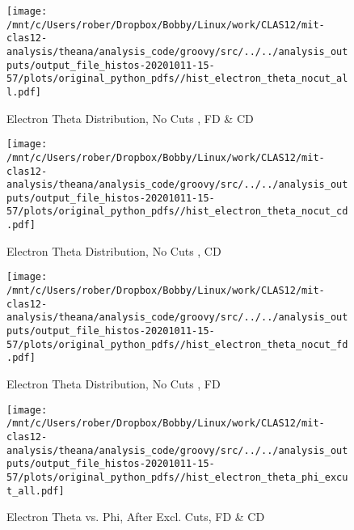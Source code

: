 \documentclass{article}
\begin{document}
\begin{landscape}
    \begin{figure}[h]
        \centering

        \texttt{[image: /mnt/c/Users/rober/Dropbox/Bobby/Linux/work/CLAS12/mit-clas12-analysis/theana/analysis\_code/groovy/src/../../analysis\_outputs/output\_file\_histos-20201011-15-57/plots/original\_python\_pdfs//hist\_electron\_theta\_nocut\_all.pdf]}
        \captionsetup{textformat=empty,labelformat=blank}
        \caption{Electron Theta Distribution, No Cuts , FD \& CD}
    \end{figure}
    \clearpage
    
    \begin{figure}[h]
        \centering

        \texttt{[image: /mnt/c/Users/rober/Dropbox/Bobby/Linux/work/CLAS12/mit-clas12-analysis/theana/analysis\_code/groovy/src/../../analysis\_outputs/output\_file\_histos-20201011-15-57/plots/original\_python\_pdfs//hist\_electron\_theta\_nocut\_cd.pdf]}
        \captionsetup{textformat=empty,labelformat=blank}
        \caption{Electron Theta Distribution, No Cuts , CD}
    \end{figure}
    \clearpage
    
    \begin{figure}[h]
        \centering

        \texttt{[image: /mnt/c/Users/rober/Dropbox/Bobby/Linux/work/CLAS12/mit-clas12-analysis/theana/analysis\_code/groovy/src/../../analysis\_outputs/output\_file\_histos-20201011-15-57/plots/original\_python\_pdfs//hist\_electron\_theta\_nocut\_fd.pdf]}
        \captionsetup{textformat=empty,labelformat=blank}
        \caption{Electron Theta Distribution, No Cuts , FD}
    \end{figure}
    \clearpage
    
    \begin{figure}[h]
        \centering

        \texttt{[image: /mnt/c/Users/rober/Dropbox/Bobby/Linux/work/CLAS12/mit-clas12-analysis/theana/analysis\_code/groovy/src/../../analysis\_outputs/output\_file\_histos-20201011-15-57/plots/original\_python\_pdfs//hist\_electron\_theta\_phi\_excut\_all.pdf]}
        \captionsetup{textformat=empty,labelformat=blank}
        \caption{Electron Theta vs. Phi, After Excl. Cuts, FD \& CD}
    \end{figure}
    \clearpage
    
    \begin{figure}[h]
        \centering


\end{figure}
\end{landscape}
\end{document}
